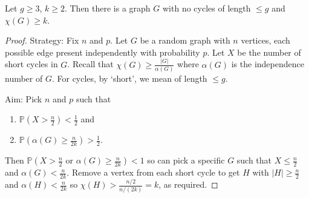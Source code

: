 \documentclass{article}
\begin{document}
\begin{nthm}\label{thm:39}
    Let $g \geq 3$, $k \geq 2$. Then there is a graph $G$ with no cycles of length $\leq g$ and $\chi(G) \geq k$.
\end{nthm}
\begin{proof}
    Strategy: Fix $n$ and $p$. Let $G$ be a random graph with $n$ vertices, each possible edge present independently with probability $p$.
    Let $X$ be the number of short cycles in $G$.
    Recall that $\chi(G) \geq \frac{|G|}{\alpha(G)}$ where $\alpha(G)$ is the independence number of $G$.
    For cycles, by `short', we mean of length $\leq g$.

    Aim: Pick $n$ and $p$ such that
    \begin{enumerate}
        \item $\mathbb{P}(X > \frac{n}{2}) < \frac{1}{2}$ and
        \item $\mathbb{P}(\alpha(G) \geq \frac{n}{2k}) > \frac{1}{2}$.
    \end{enumerate}
    Then $\mathbb{P}(X > \frac{n}{2} \text{ or } \alpha(G) \geq \frac{n}{2k}) < 1$ so can pick a specific $G$ such that $X \leq \frac{n}{2}$ and $\alpha(G) < \frac{n}{2k}$.
    Remove a vertex from each short cycle to get $H$ with $|H| \geq \frac{n}{2}$ and $\alpha(H) < \frac{n}{2k}$ so $\chi(H) > \frac{n/2}{n/(2k)} = k$, as required.


\end{proof}
\end{document}
